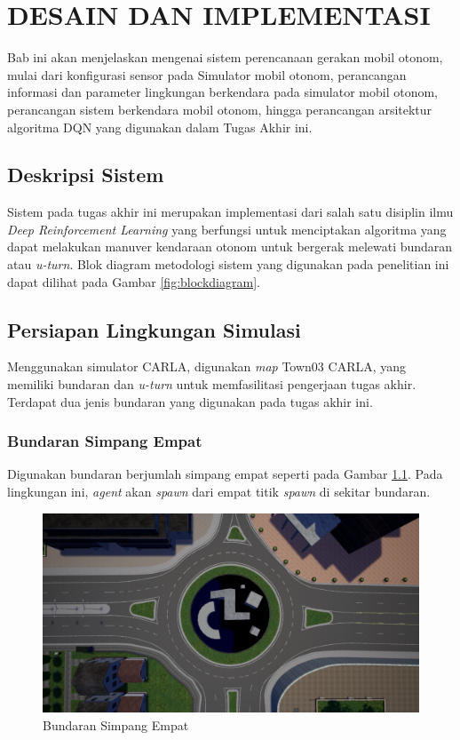 \chapter{DESAIN DAN IMPLEMENTASI}
\label{chap:desainimplementasi}

Bab ini akan menjelaskan mengenai sistem perencanaan gerakan mobil otonom, mulai dari konfigurasi sensor pada Simulator mobil otonom, perancangan informasi dan parameter lingkungan berkendara pada simulator mobil otonom, perancangan sistem berkendara mobil otonom, hingga perancangan arsitektur algoritma DQN yang digunakan dalam Tugas Akhir ini.


\section{Deskripsi Sistem}
\label{sec:deskripsisistem}

Sistem pada tugas akhir ini merupakan implementasi dari salah satu disiplin ilmu \textit{Deep Reinforcement Learning} yang berfungsi untuk menciptakan algoritma yang dapat melakukan manuver kendaraan otonom untuk bergerak melewati bundaran atau \textit{u-turn}. Blok diagram metodologi sistem yang digunakan pada penelitian ini dapat dilihat pada Gambar \ref{fig:blockdiagram}.

\section{Persiapan Lingkungan Simulasi}
\label{sec:simulasi}
Menggunakan simulator CARLA, digunakan \textit{map} Town03 CARLA, yang memiliki bundaran dan \textit{u-turn }untuk memfasilitasi pengerjaan tugas akhir. Terdapat dua jenis bundaran yang digunakan pada tugas akhir ini.

\subsection{Bundaran Simpang Empat}
Digunakan bundaran berjumlah simpang empat seperti pada Gambar  \ref{fig:bundaran_town03}. Pada lingkungan ini, \textit{agent} akan \textit{spawn }dari empat titik \textit{spawn} di sekitar bundaran.
\begin{figure}[H] 
	\centering
	\includegraphics[width=.7\linewidth]{images/bundaran}
	\caption{Bundaran Simpang Empat}
	\label{fig:bundaran_town03}
\end{figure}

